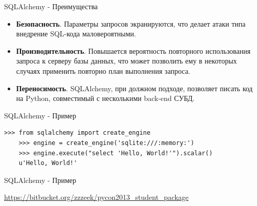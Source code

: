 \begin{frame}{SQLAlchemy - Преимущества}

  \begin{itemize}

    \item \textbf{Безопасность}. Параметры запросов экранируются, что делает
      атаки типа внедрение SQL-кода маловероятными.
    \item \textbf{Производительность}. Повышается вероятность повторного
      использования запроса к серверу базы данных, что может позволить ему в
      некоторых случаях применить повторно план выполнения запроса.
    \item \textbf{Переносимость}. SQLAlchemy, при должном подходе, позволяет
      писать код на Python, совместимый с несколькими back-end СУБД.

  \end{itemize}

\end{frame}

\begin{frame}[fragile]{SQLAlchemy - Пример}

    \begin{lstlisting}[style=python]
    >>> from sqlalchemy import create_engine
    >>> engine = create_engine('sqlite:///:memory:')
    >>> engine.execute("select 'Hello, World!'").scalar()
    u'Hello, World!'
    \end{lstlisting}

\end{frame}

\begin{frame}[fragile]{SQLAlchemy - Пример}

  \url{https://bitbucket.org/zzzeek/pycon2013_student_package}

\end{frame}



